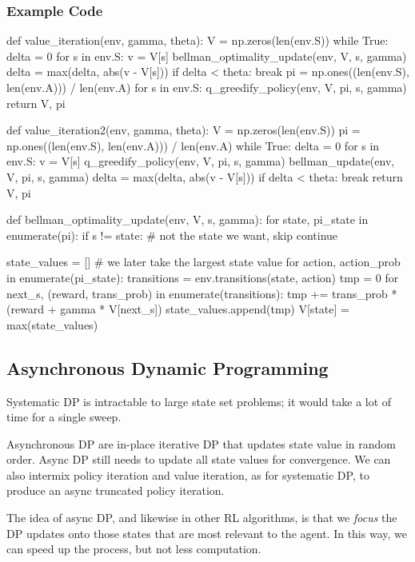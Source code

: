 \documentclass[sutton_barto_notes.tex]{subfiles}
\begin{document}
\subsubsection{Example Code}
\begin{python}
def value_iteration(env, gamma, theta):
    V = np.zeros(len(env.S))
    while True:
        delta = 0
        for s in env.S:
            v = V[s]
            bellman_optimality_update(env, V, s, gamma)
            delta = max(delta, abs(v - V[s]))
        if delta < theta:
            break
    pi = np.ones((len(env.S), len(env.A))) / len(env.A)
    for s in env.S:
        q_greedify_policy(env, V, pi, s, gamma)
    return V, pi

def value_iteration2(env, gamma, theta):
    V = np.zeros(len(env.S))
    pi = np.ones((len(env.S), len(env.A))) / len(env.A)
    while True:
        delta = 0
        for s in env.S:
            v = V[s]
            q_greedify_policy(env, V, pi, s, gamma)
            bellman_update(env, V, pi, s, gamma)
            delta = max(delta, abs(v - V[s]))
        if delta < theta:
            break
    return V, pi

def bellman_optimality_update(env, V, s, gamma):
    for state, pi_state in enumerate(pi):
        if s != state:  # not the state we want, skip
            continue

        state_values = [] # we later take the largest state value
        for action, action_prob in enumerate(pi_state):
            transitions = env.transitions(state, action)
            tmp = 0
            for next_s, (reward, trans_prob) in enumerate(transitions):
                tmp += trans_prob * (reward + gamma * V[next_s])
            state_values.append(tmp)
        V[state] = max(state_values)
\end{python}

\subsection{Asynchronous Dynamic Programming}

Systematic DP is intractable to large state set problems; it would take a lot of time for a single sweep.

Asynchronous DP are in-place iterative DP that updates state value in random order. Async DP still needs to update all state values for convergence. We can also intermix policy iteration and value iteration, as for systematic DP, to produce an async truncated policy iteration.

The idea of async DP, and likewise in other RL algorithms, is that we \textit{focus} the DP updates onto those states that are most relevant to the agent. In this way, we can speed up the process, but not less computation.
\end{document}
